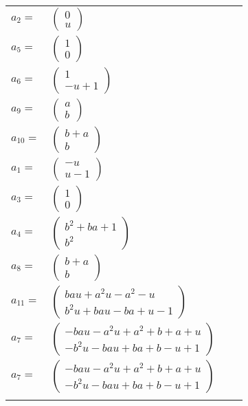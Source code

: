 \documentclass[1p]{elsarticle_modified}
\theoremstyle{definition}
\begin{document}
\begin{tabular}{m{7pt} m{180pt} m{7pt} m{180pt} }
\flushright $a_{2}=$&$\begin{pmatrix}0\\u\end{pmatrix}$ \\
\flushright $a_{5}=$&$\begin{pmatrix}1\\0\end{pmatrix}$ \\
\flushright $a_{6}=$&$\begin{pmatrix}1\\- u+1\end{pmatrix}$ \\
\flushright $a_{9}=$&$\begin{pmatrix}a\\b\end{pmatrix}$ \\
\flushright $a_{10}=$&$\begin{pmatrix}b+a\\b\end{pmatrix}$ \\
\flushright $a_{1}=$&$\begin{pmatrix}- u\\u-1\end{pmatrix}$ \\
\flushright $a_{3}=$&$\begin{pmatrix}1\\0\end{pmatrix}$ \\
\flushright $a_{4}=$&$\begin{pmatrix}b^2+b a+1\\b^2\end{pmatrix}$ \\
\flushright $a_{8}=$&$\begin{pmatrix}b+a\\b\end{pmatrix}$ \\
\flushright $a_{11}=$&$\begin{pmatrix}b a u+a^2 u- a^2- u\\b^2 u+b a u- b a+u-1\end{pmatrix}$ \\
\flushright $a_{7}=$&$\begin{pmatrix}- b a u- a^2 u+a^2+b+a+u\\- b^2 u- b a u+b a+b- u+1\end{pmatrix}$\\ \flushright $a_{7}=$&$\begin{pmatrix}- b a u- a^2 u+a^2+b+a+u\\- b^2 u- b a u+b a+b- u+1\end{pmatrix}$\\&\end{tabular}
\end{document}
